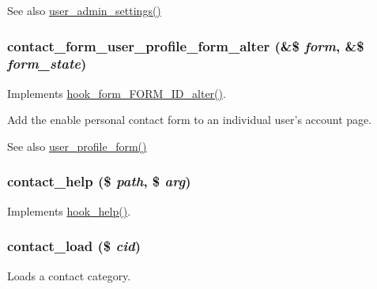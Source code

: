 \begin{DoxySeeAlso}{See also}
\hyperlink{group__forms_ga8cb1bc70278e0e628fd17c2ec8353bd1}{user\_\-admin\_\-settings()} 
\end{DoxySeeAlso}
\hypertarget{contact_8module_a00ac03d08ff9477e1a06f250d33b28b1}{
\subsubsection[{contact\_\-form\_\-user\_\-profile\_\-form\_\-alter}]{\setlength{\rightskip}{0pt plus 5cm}contact\_\-form\_\-user\_\-profile\_\-form\_\-alter (\&\$ {\em form}, \/  \&\$ {\em form\_\-state})}}
\label{contact_8module_a00ac03d08ff9477e1a06f250d33b28b1}
Implements \hyperlink{group__hooks_ga8d4a4089551493d55911bd5c4f218264}{hook\_\-form\_\-FORM\_\-ID\_\-alter()}.

Add the enable personal contact form to an individual user's account page.

\begin{DoxySeeAlso}{See also}
\hyperlink{group__forms_ga600bbf7cf395cbfedae1c3bc33727346}{user\_\-profile\_\-form()} 
\end{DoxySeeAlso}
\hypertarget{contact_8module_a9cef8798ccd1c2adf779f8333dab9f02}{
\subsubsection[{contact\_\-help}]{\setlength{\rightskip}{0pt plus 5cm}contact\_\-help (\$ {\em path}, \/  \$ {\em arg})}}
\label{contact_8module_a9cef8798ccd1c2adf779f8333dab9f02}
Implements \hyperlink{group__hooks_ga5589c2714a782738e8851c4c90231f0e}{hook\_\-help()}. \hypertarget{contact_8module_a132b73d26638a6cf021bc98bf26ef811}{
\subsubsection[{contact\_\-load}]{\setlength{\rightskip}{0pt plus 5cm}contact\_\-load (\$ {\em cid})}}
\label{contact_8module_a132b73d26638a6cf021bc98bf26ef811}
Loads a contact category.


